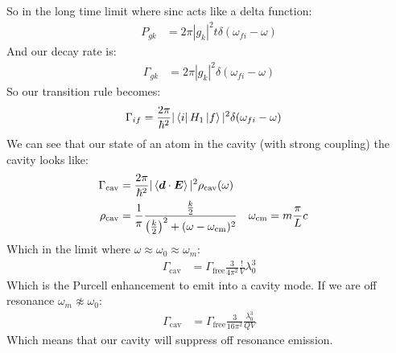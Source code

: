So in the long time limit where sinc acts like a delta function:
\begin{align*}
	P_{gk} &= 2\pi|g_k|^2 t\delta(\omega_{fi} -\omega)
\end{align*}
And our decay rate is:
\begin{align*}
	\Gamma_{gk} &= 2\pi|g_k|^2 \delta(\omega_{fi} -\omega)
\end{align*}
So our transition rule becomes:
\begin{align*}
	\Gamma_{if} &= \frac{2\pi}{\hbar^2}|\bra{i}H_1\ket{f}|^2 \delta(\omega_{fi}-\omega)
\end{align*}
We can see that our state of an atom in the cavity (with strong coupling) the cavity looks like:
\begin{align*}
	\Gamma_\text{cav} &= \frac{2\pi}{\hbar^2} |\expval{\bm{d}\cdot\bm{E}}|^2 \rho_\text{cav}(\omega) \\
	\rho_\text{cav} &= \frac{1}{\pi} \frac{\frac{k}{2}}{\left(\frac{k}{2}\right)^2 + (\omega-\omega_\text{cm})^2} & \omega_\text{cm} &= m\frac{\pi}{L} c
\end{align*}
Which in the limit where $\omega\approx\omega_0\approx\omega_m$:
\begin{align*}
	\Gamma_\text{cav} &= \Gamma_\text{free} \frac{3}{4\pi^2} \frac{!}{V}\lambda^3_0
\end{align*}
Which is the Purcell enhancement to emit into a cavity mode.
If we are off resonance $\omega_m\not\approx \omega_0$:
\begin{align*}
	\Gamma_\text{cav} &= \Gamma_\text{free} \frac{3}{16\pi^2} \frac{\lambda^3_0}{QV}
\end{align*}
Which means that our cavity will suppress off resonance emission.

